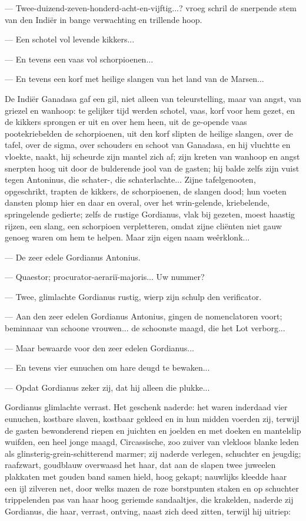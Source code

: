 \documentclass[a4paper, 12pt, oneside, dutch]{article}
\begin{document}
--- Twee-duizend-zeven-honderd-acht-en-vijftig...? vroeg schril de snerpende stem van den Indiër in bange verwachting en trillende hoop.

--- Een schotel vol levende kikkers...

--- En tevens een vaas vol schorpioenen...

--- En tevens een korf met heilige slangen van het land van de Marsen...

De Indiër Ganadasa gaf een gil, niet alleen van teleurstelling, maar van angst, van griezel en wanhoop: te gelijker tijd werden schotel, vaas, korf voor hem gezet, en de kikkers sprongen er uit en over hem heen, uit de ge-opende vaas pootekriebelden de schorpioenen, uit den korf slipten de heilige slangen, over de tafel, over de sigma, over schouders en schoot van Ganadasa, en hij vluchtte en vloekte, naakt, hij scheurde zijn mantel zich af; zijn kreten van wanhoop en angst snerpten hoog uit door de bulderende jool van de gasten; hij balde zelfs zijn vuist tegen Antoninus, die schater-, die schaterlachte... Zijne tafelgenooten, opgeschrikt, trapten de kikkers, de schorpioenen, de slangen dood; hun voeten dansten plomp hier en daar en overal, over het wrin-gelende, kriebelende, springelende gedierte; zelfs de rustige Gordianus, vlak bij gezeten, moest haastig rijzen, een slang, een schorpioen verpletteren, omdat zijne cliënten niet gauw genoeg waren om hem te helpen. Maar zijn eigen naam weêrklonk...

--- De zeer edele Gordianus Antonius.

--- Quaestor; procurator-aerariï-majoris... Uw nummer?

--- Twee, glimlachte Gordianus rustig, wierp zijn schulp den verificator.

--- Aan den zeer edelen Gordianus Antonius, gingen de nomenclatoren voort; beminnaar van schoone vrouwen... de schoonste maagd, die het Lot verborg...

--- Maar bewaarde voor den zeer edelen Gordianus...

--- En tevens vier eunuchen om hare deugd te bewaken...

--- Opdat Gordianus zeker zij, dat hij alleen die plukke...

Gordianus glimlachte verrast. Het geschenk naderde: het waren inderdaad vier eunuchen, kostbare slaven, kostbaar gekleed en in hun midden voerden zij, terwijl de gasten bewonderend riepen en juichten en joelden en met doeken en mantelslip wuifden, een heel jonge maagd, Circassische, zoo zuiver van vlekloos blanke leden als glinsterig-grein-schitterend marmer; zij naderde verlegen, schuchter en jeugdig; raafzwart, goudblauw overwaasd het haar, dat aan de slapen twee juweelen plakkaten met gouden band samen hield, hoog gekapt; nauwlijks kleedde haar een ijl zilveren net, door welks mazen de roze borstpunten staken en op schuchter trippelenden pas van haar hoog geriemde sandaaltjes, die krakelden, naderde zij Gordianus, die haar, verrast, ontving, naast zich deed zitten, terwijl hij uitriep:
\end{document}
